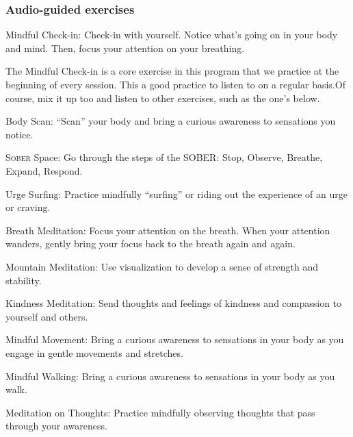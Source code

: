 	\subsubsection*{Audio-guided exercises}
	\begin{description*}
		\item[Mindful Check-in:] Check-in with yourself. Notice what’s going on in your body and mind. Then, focus your attention on your breathing. \par The Mindful Check-in is a core exercise in this program that we practice at the beginning of every session. This a good practice to listen to on a regular basis.Of course, mix it up too and listen to other exercises, such as the one’s below.
		\item[Body Scan:] “Scan” your body and bring a curious awareness to sensations you notice.
		\item[\textsc{Sober} Space:] Go through the steps of the SOBER: Stop, Observe, Breathe, Expand, Respond.
		\item[Urge Surfing:] Practice mindfully “surfing” or riding out the experience of an urge or craving.
		\item[Breath Meditation:] Focus your attention on the breath. When your attention wanders, gently bring your focus back to the breath again and again.
		\item[Mountain Meditation:] Use visualization to develop a sense of strength and stability.
		\item[Kindness Meditation:] Send thoughts and feelings of kindness and compassion to yourself and others.
		\item[Mindful Movement:] Bring a curious awareness to sensations in your body as you engage in gentle movements and stretches.
		\item[Mindful Walking:] Bring a curious awareness to sensations in your body as you walk.
		\item[Meditation on Thoughts:] Practice mindfully observing thoughts that pass through your awareness.
	\end{description*}

\clearpage
